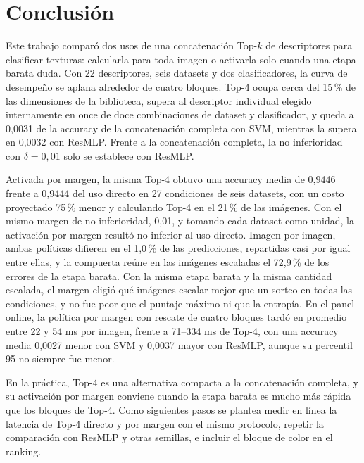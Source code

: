 \documentclass[a4paper,fleqn]{cas-sc}
\begin{document}
\section{Conclusión}\label{sec:conclusion}

Este trabajo comparó dos usos de una concatenación Top-$k$ de descriptores para clasificar texturas: calcularla para toda imagen o activarla solo cuando una etapa barata duda. Con 22 descriptores, seis datasets y dos clasificadores, la curva de desempeño se aplana alrededor de cuatro bloques. Top-4 ocupa cerca del 15\,\% de las dimensiones de la biblioteca, supera al descriptor individual elegido internamente en once de doce combinaciones de dataset y clasificador, y queda a 0,0031 de la accuracy de la concatenación completa con SVM, mientras la supera en 0,0032 con ResMLP. Frente a la concatenación completa, la no inferioridad con $\delta=0{,}01$ solo se establece con ResMLP.

Activada por margen, la misma Top-4 obtuvo una accuracy media de 0,9446 frente a 0,9444 del uso directo en 27 condiciones de seis datasets, con un costo proyectado 75\,\% menor y calculando Top-4 en el 21\,\% de las imágenes. Con el mismo margen de no inferioridad, 0,01, y tomando cada dataset como unidad, la activación por margen resultó no inferior al uso directo. Imagen por imagen, ambas políticas difieren en el 1,0\,\% de las predicciones, repartidas casi por igual entre ellas, y la compuerta reúne en las imágenes escaladas el 72,9\,\% de los errores de la etapa barata. Con la misma etapa barata y la misma cantidad escalada, el margen eligió qué imágenes escalar mejor que un sorteo en todas las condiciones, y no fue peor que el puntaje máximo ni que la entropía. En el panel online, la política por margen con rescate de cuatro bloques tardó en promedio entre 22 y 54 ms por imagen, frente a 71--334 ms de Top-4, con una accuracy media 0,0027 menor con SVM y 0,0037 mayor con ResMLP, aunque su percentil 95 no siempre fue menor.

En la práctica, Top-4 es una alternativa compacta a la concatenación completa, y su activación por margen conviene cuando la etapa barata es mucho más rápida que los bloques de Top-4. Como siguientes pasos se plantea medir en línea la latencia de Top-4 directo y por margen con el mismo protocolo, repetir la comparación con ResMLP y otras semillas, e incluir el bloque de color en el ranking.
\end{document}
